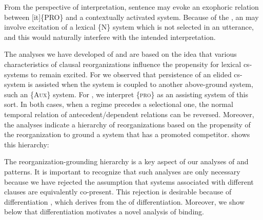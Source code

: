   From the perspective of interpretation, sentence  may evoke an exophoric relation between [it]\{PRO\} and a contextually activated system. Because of the , an  may involve excitation of a lexical \{N\} system which is not selected in an utterance, and this would naturally interfere with the intended interpretation. 

  The analyses we have developed of  and  are based on the idea that various characteristics of clausal reorganizations influence the propensity for lexical cs-systems to remain excited. For  we observed that persistence of an elided cs-system is assisted when the system is coupled to another above-ground system, such an \{A\textsc{ux}\} system. For , we interpret \{\textsc{pro}\} as an assisting system of this sort. In both cases, when a  regime precedes a selectional one, the normal temporal relation of antecedent/dependent relations can be reversed. Moreover, the analyses indicate a hierarchy of reorganizations based on the propensity of the reorganization to ground a system that has a promoted competitor.  shows this hierarchy:

\begin{table}
\caption{Hierarchy of reorganizations based on grounding propensity.}\label{tab:7:3}
\end{table}

  The reorganization-grounding hierarchy is a key aspect of our analyses of  and  patterns. It is important to recognize that such analyses are only necessary because we have rejected the assumption that systems associated with different clauses are equivalently co-present. This rejection is desirable because of differentiation , which derives from the  of differentiation. Moreover, we show below that differentiation motivates a novel analysis of binding.

